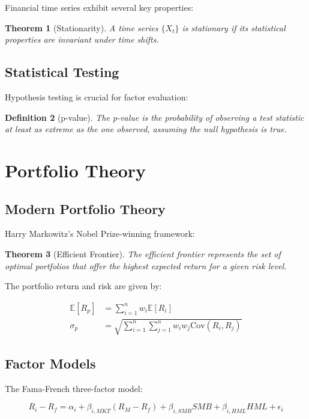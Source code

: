 \documentclass[11pt,letterpaper]{book}
\newtheorem{theorem}{Theorem}[chapter]
\newtheorem{definition}[theorem]{Definition}
\newcommand{\E}{\mathbb{E}}
\newcommand{\Cov}{\mathrm{Cov}}
\begin{document}
Financial time series exhibit several key properties:

\begin{theorem}[Stationarity]
A time series $\{X_t\}$ is stationary if its statistical properties are invariant under time shifts.
\end{theorem}

\subsection{Statistical Testing}

Hypothesis testing is crucial for factor evaluation:

\begin{definition}[p-value]
The p-value is the probability of observing a test statistic at least as extreme as the one observed, assuming the null hypothesis is true.
\end{definition}

\section{Portfolio Theory}

\subsection{Modern Portfolio Theory}

Harry Markowitz's Nobel Prize-winning framework:

\begin{theorem}[Efficient Frontier]
The efficient frontier represents the set of optimal portfolios that offer the highest expected return for a given risk level.
\end{theorem}

The portfolio return and risk are given by:

\begin{align}
\E[R_p] &= \sum_{i=1}^n w_i \E[R_i] \\
\sigma_p &= \sqrt{\sum_{i=1}^n \sum_{j=1}^n w_i w_j \Cov(R_i, R_j)}
\end{align}

\subsection{Factor Models}

The Fama-French three-factor model:

\begin{equation}
R_i - R_f = \alpha_i + \beta_{i,MKT}(R_M - R_f) + \beta_{i,SMB}SMB + \beta_{i,HML}HML + \epsilon_i
\end{equation}
\end{document}
